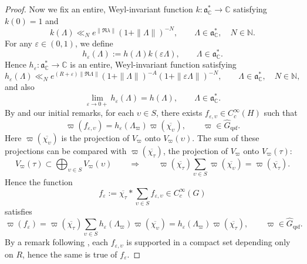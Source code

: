 \documentclass[11pt,oneside]{amsart}
\numberwithin{equation}{section}
\theoremstyle{remark}
\theoremstyle{plain}
\newcommand\NN{\mathbb{N}}
\newcommand\CC{\mathbb{C}}
\newcommand\mfa{\mathfrak{a}}
\newcommand\ov{\overline}
\newcommand\eps{\varepsilon}
\newcommand\Gqsf{\widehat{G}_\mathrm{qsf}}
\begin{document}
\begin{proof}
Now we fix an entire, Weyl-invariant function $k:\mfa_\CC^*\to\CC$ satisfying $k(0)=1$ and
\[k(\Lambda)\ll_N e^{\|\Re\lambda\|}(1+\|\Lambda\|)^{-N},\qquad\Lambda\in\mfa_\CC^*,\quad N\in\NN.\]
For any $\eps\in(0,1)$, we define
\[h_\eps(\Lambda):=h(\Lambda)k(\eps\Lambda),\qquad\Lambda\in\mfa_\CC^*.\]
Hence $h_\eps:\mfa_\CC^*\to\CC$ is an entire, Weyl-invariant function satisfying
\begin{equation}\label{hdecay}
h_\eps(\Lambda)\ll_N e^{(R+\eps)\|\Re\Lambda\|}(1+\|\Lambda\|)^{-A}(1+\|\eps\Lambda\|)^{-N},\qquad\Lambda\in\mfa_\CC^*,\quad N\in\NN,
\end{equation}
and also
\[\lim_{\eps\to 0+}h_\eps(\Lambda)=h(\Lambda),\qquad\Lambda\in\mfa_\CC^*.\]
By \cite[Th.~2]{DFJ} and our initial remarks, for each $\upsilon\in S$, there exists $f_{\eps,\upsilon}\in C_c^\infty(H)$ such that
\[\varpi(f_{\eps,\upsilon})=h_\eps(\Lambda_\varpi)\varpi(\ov{\chi_{\upsilon}}),\qquad\varpi\in\Gqsf.\]
Here $\varpi(\ov{\chi_{\upsilon}})$ is the projection of $V_\varpi$ onto $V_\varpi(\upsilon)$. The sum of these projections can be compared with $\varpi(\ov{\chi_\tau})$, the projection of $V_\varpi$ onto $V_\varpi(\tau)$:
\[V_\varpi(\tau)\subset\bigoplus_{\upsilon\in S}V_\varpi(\upsilon)\qquad\Longrightarrow\qquad
\varpi(\ov{\chi_\tau})\sum_{\upsilon\in S}\varpi(\ov{\chi_{\upsilon}})=\varpi(\ov{\chi_\tau}).\]
Hence the function
\[f_\eps:=\ov{\chi_\tau}\ast\sum_{\upsilon\in S}f_{\eps,\upsilon}\in C_c^\infty(G)\]
satisfies
\[\varpi(f_\eps)=\varpi(\ov{\chi_\tau})\sum_{\upsilon\in S}h_\eps(\Lambda_\varpi)\varpi(\ov{\chi_{\upsilon}})=h_\eps(\Lambda_\varpi)\varpi(\ov{\chi_\tau}),\qquad\varpi\in\Gqsf.\]
By a remark following \cite[Th.~1]{DFJ}, each $f_{\eps,\upsilon}$ is supported in a compact set depending only on $R$, hence the same is true of $f_\eps$.


\end{proof}
\end{document}

